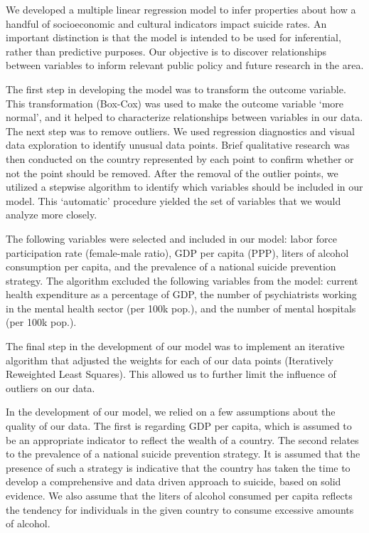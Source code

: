 \documentclass[]{article}
\begin{document}
We developed a multiple linear regression model to infer properties
about how a handful of socioeconomic and cultural indicators impact
suicide rates. An important distinction is that the model is intended to
be used for inferential, rather than predictive purposes. Our objective
is to discover relationships between variables to inform relevant public
policy and future research in the area.

The first step in developing the model was to transform the outcome
variable. This transformation (Box-Cox) was used to make the outcome
variable `more normal', and it helped to characterize relationships
between variables in our data. The next step was to remove outliers. We
used regression diagnostics and visual data exploration to identify
unusual data points. Brief qualitative research was then conducted on
the country represented by each point to confirm whether or not the
point should be removed. After the removal of the outlier points, we
utilized a stepwise algorithm to identify which variables should be
included in our model. This `automatic' procedure yielded the set of
variables that we would analyze more closely.

The following variables were selected and included in our model: labor
force participation rate (female-male ratio), GDP per capita (PPP),
liters of alcohol consumption per capita, and the prevalence of a
national suicide prevention strategy. The algorithm excluded the
following variables from the model: current health expenditure as a
percentage of GDP, the number of psychiatrists working in the mental
health sector (per 100k pop.), and the number of mental hospitals (per
100k pop.).

The final step in the development of our model was to implement an
iterative algorithm that adjusted the weights for each of our data
points (Iteratively Reweighted Least Squares). This allowed us to
further limit the influence of outliers on our data.

In the development of our model, we relied on a few assumptions about
the quality of our data. The first is regarding GDP per capita, which is
assumed to be an appropriate indicator to reflect the wealth of a
country. The second relates to the prevalence of a national suicide
prevention strategy. It is assumed that the presence of such a strategy
is indicative that the country has taken the time to develop a
comprehensive and data driven approach to suicide, based on solid
evidence. We also assume that the liters of alcohol consumed per capita
reflects the tendency for individuals in the given country to consume
excessive amounts of alcohol.
\end{document}
